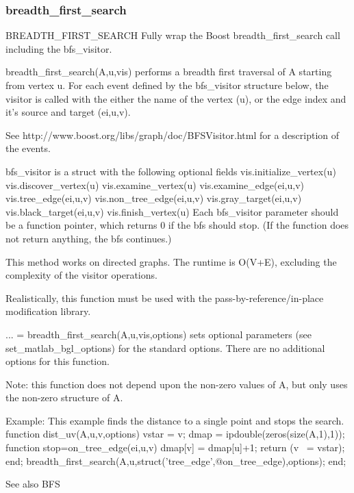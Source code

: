 \subsubsection*{breadth\_first\_search}
\begin{mcode}
  BREADTH_FIRST_SEARCH Fully wrap the Boost breadth_first_search call
  including the bfs_visitor.
 
  breadth_first_search(A,u,vis) performs a breadth first traversal 
  of A starting from vertex u.  For each event defined by the bfs_visitor 
  structure below, the visitor is called with the either the name of the 
  vertex (u), or the edge index and it's source and target (ei,u,v).  
 
  See http://www.boost.org/libs/graph/doc/BFSVisitor.html for a description
  of the events.
  
  bfs_visitor is a struct with the following optional fields
     vis.initialize_vertex(u)
     vis.discover_vertex(u)
     vis.examine_vertex(u)
     vis.examine_edge(ei,u,v)
     vis.tree_edge(ei,u,v)
     vis.non_tree_edge(ei,u,v)
     vis.gray_target(ei,u,v)
     vis.black_target(ei,u,v)
     vis.finish_vertex(u)
  Each bfs_visitor parameter should be a function pointer, which returns 0
  if the bfs should stop.  (If the function does not return anything, the
  bfs continues.)
 
  This method works on directed graphs.
  The runtime is O(V+E), excluding the complexity of the visitor
  operations.
 
  Realistically, this function must be used with the
  pass-by-reference/in-place modification library.  
 
  ... = breadth_first_search(A,u,vis,options) sets optional parameters (see 
  set_matlab_bgl_options) for the standard options.
    There are no additional options for this function.
 
  Note: this function does not depend upon the non-zero values of A, but
  only uses the non-zero structure of A.
 
  Example:
    This example finds the distance to a single point and stops the search.
    function dist_uv(A,u,v,options)
      vstar = v;
      dmap = ipdouble(zeros(size(A,1),1));
      function stop=on_tree_edge(ei,u,v)
        dmap[v] = dmap[u]+1;
        return (v ~= vstar);
      end;
      breadth_first_search(A,u,struct('tree_edge',@on_tree_edge),options);
    end;
 
  See also BFS
\end{mcode}
\newpage
